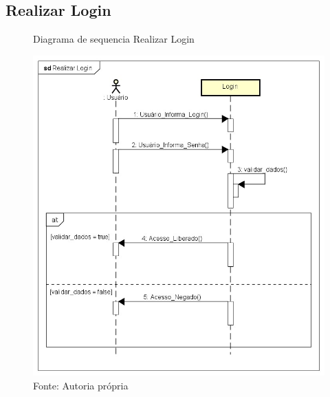 \documentclass{utfpr-pg}
\begin{document}
    \subsection{Realizar Login}
        \begin{figure}[H]
            \centering
            \captionsetup{width=0.9\textwidth}
            \caption{Diagrama de sequencia Realizar Login}
            \includegraphics[width=\linewidth]{fotos/seq1.jpg}
            \caption*{Fonte: Autoria própria}
            \label{fig:Diagrama de Classes}
        \end{figure}
        
\end{document}
